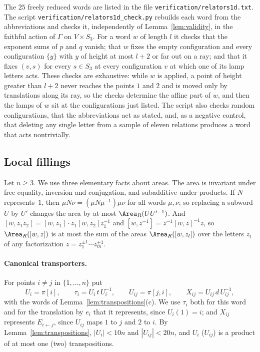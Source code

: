 The $25$ freely reduced words are listed in the file \texttt{verification/relators1d.txt}. The script \texttt{verification/relators1d\_check.py}
rebuilds each word from the abbreviations and checks it, independently of Lemma~\ref{lem:validity}, in the faithful action of $\Gamma$ on
$V\times S_3$. For a word $w$ of length $l$ it checks that the exponent sums of $p$ and $q$ vanish; that $w$ fixes the empty configuration and
every configuration $\{y\}$ with $y$ of height at most $l+2$ or far out on a ray; and that it fixes $(v,s)$ for every $s\in S_3$ at every
configuration $v$ at which one of its lamp letters acts. These checks are exhaustive: while $w$ is applied, a point of height greater than $l+2$
never reaches the points $1$ and $2$ and is moved only by translations along its ray, so the checks determine the affine part of $w$, and then
the lamps of $w$ sit at the configurations just listed. The script also checks random configurations, that the abbreviations act as stated, and,
as a negative control, that deleting any single letter from a sample of eleven relations produces a word that acts nontrivially.

\subsection{Local fillings}

Let $n\ge3$. We use three elementary facts about areas. The area is invariant under free equality, inversion and conjugation, and subadditive
under products. If $N$ represents~$1$, then $\mu N\nu=(\mu N\mu^{-1})\mu\nu$ for all words $\mu,\nu$; so replacing a subword $U$ by $U'$ changes
the area by at most $\Area_R(UU'^{-1})$. And $[w,z_1z_2]=[w,z_1]\cdot z_1[w,z_2]z_1^{-1}$ and $[w,z^{-1}]=z^{-1}[w,z]^{-1}z$, so
$\Area_R([w,z])$ is at most the sum of the areas $\Area_R([w,z_l])$ over the letters $z_l$ of any factorization $z=z_1^{\pm1}\cdots z_m^{\pm1}$.

\paragraph{Canonical transporters.} For points $i\ne j$ in $\{1,\dots,n\}$ put
\[
U_i=\pi[i],\qquad \tau_i=U_i\,t\,U_i^{-1},\qquad U_{ij}=\pi[j,i],\qquad X_{ij}=U_{ij}\,d\,U_{ij}^{-1},
\]
with the words of Lemma~\ref{lem:transpositions}(c). We use $\tau_i$ both for this word and for the translation by $e_i$ that it represents, since
$U_i(1)=i$; and $X_{ij}$ represents $E_{i\leftarrow j}$, since $U_{ij}$ maps $1$ to $j$ and $2$ to $i$. By Lemma~\ref{lem:transpositions},
$|U_i|<10n$ and $|U_{ij}|<20n$, and $U_i$ ($U_{ij}$) is a product of at most one (two) transpositions.

